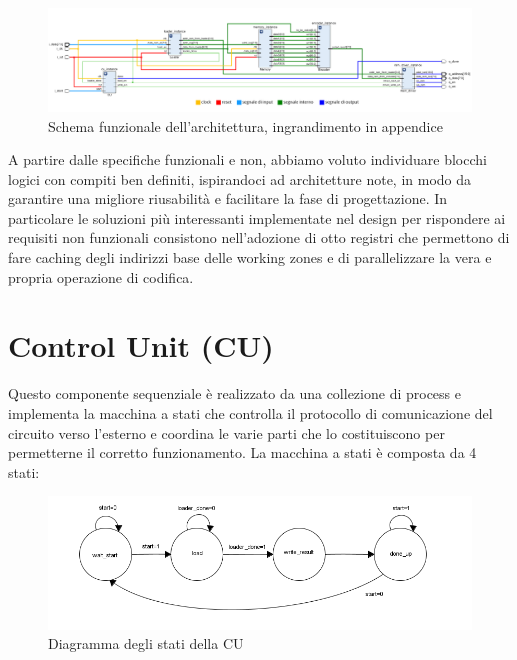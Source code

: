 \documentclass[10pt,english, openany]{book}
\begin{document}
\begin{figure}[h!]
    \centering
    \includegraphics[scale=0.26]{schematics.png}
    \caption{Schema funzionale dell'architettura, ingrandimento in 					appendice}
    \label{fig:schematic}
\end{figure}{}



A partire dalle specifiche funzionali e non, abbiamo voluto individuare blocchi logici con compiti ben definiti, ispirandoci ad architetture note, in modo da garantire una migliore riusabilità e facilitare la fase di progettazione. In particolare le soluzioni più interessanti implementate nel design per rispondere ai requisiti non funzionali consistono nell’adozione di otto registri che permettono di fare caching degli indirizzi base delle working zones e di parallelizzare la vera e propria operazione di codifica.

\section{Control Unit (CU)}

Questo componente sequenziale è realizzato da una collezione di process e implementa la macchina a stati che controlla il protocollo di comunicazione del circuito verso l’esterno e coordina le varie parti che lo costituiscono per permetterne il corretto funzionamento. La macchina a stati è composta da 4 stati:

\begin{figure}[h!] %
    \centering
    \includegraphics[scale=0.75]{stati_cu.png}
    \caption{Diagramma degli stati della CU}
    \label{fig:stati_cu}
\end{figure}{}
\end{document}
